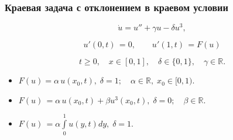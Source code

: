 \documentclass[fullscreen=true, unicode, bookmarks=false]{beamer}
\begin{document}
\begin{frame}
\begin{figure}[h]
\begin{minipage}[h]{0.2\linewidth}
\end{minipage}
\hspace{1.5cm}
\begin{minipage}[h]{0.2\linewidth}
\end{minipage}
\end{figure}

\end{frame}

\begin{frame}
\frametitle{ Краевая задача с отклонением в краевом условии }

\begin{equation}\label{boundary_problem}
	\dot u = u'' + \gamma u - \delta u^3,	
\end{equation}

\begin{equation}\label{boundary_cond}	
	u'(0, t) \, = 0, \qquad u'(1, t) \, = F(u)
\end{equation}

$$ t \geqslant 0, \quad x \in [0,1], \quad \delta \in \{0, 1\}, \quad \gamma \in \mathbb{R}. $$

\vfill

\begin{itemize}

\item $ F(u) = \alpha\,u(x_0, t), \; \delta=1; \quad \alpha \in \mathbb{R}, \; x_0 \in [0, 1). $
\item $ F(u) \, = \alpha\,u(x_0, t) + \beta u^3(x_0, t), \; \delta=0; \quad \beta \in \mathbb{R}. $
\item $ F(u) \, = \alpha\int\limits_{0}^{1} u(y, t) dy, \; \delta = 1. $

\end{itemize}

\end{frame}
\end{document}
